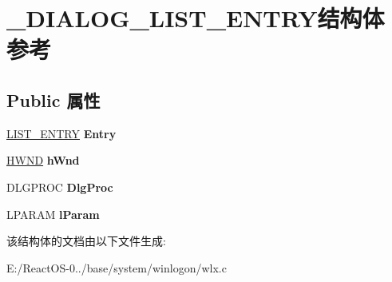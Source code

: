 \hypertarget{struct___d_i_a_l_o_g___l_i_s_t___e_n_t_r_y}{}\section{\+\_\+\+D\+I\+A\+L\+O\+G\+\_\+\+L\+I\+S\+T\+\_\+\+E\+N\+T\+R\+Y结构体 参考}
\label{struct___d_i_a_l_o_g___l_i_s_t___e_n_t_r_y}
\subsection*{Public 属性}
\begin{DoxyCompactItemize}
\item 
\mbox{\label{struct___d_i_a_l_o_g___l_i_s_t___e_n_t_r_y_a6d45c0cf84612d2be0380973ffe2b5a5}} 
\hyperlink{struct___l_i_s_t___e_n_t_r_y}{L\+I\+S\+T\+\_\+\+E\+N\+T\+RY} {\bfseries Entry}
\item 
\mbox{\label{struct___d_i_a_l_o_g___l_i_s_t___e_n_t_r_y_a59181e1c869c8fd26e33027d0d2f545b}} 
\hyperlink{interfacevoid}{H\+W\+ND} {\bfseries h\+Wnd}
\item 
\mbox{\label{struct___d_i_a_l_o_g___l_i_s_t___e_n_t_r_y_a7b360521da449f715ef6585fc511bbf9}} 
D\+L\+G\+P\+R\+OC {\bfseries Dlg\+Proc}
\item 
\mbox{\label{struct___d_i_a_l_o_g___l_i_s_t___e_n_t_r_y_aa6378bdb2ed58c9e4d5b9a6a56bcebe2}} 
L\+P\+A\+R\+AM {\bfseries l\+Param}
\end{DoxyCompactItemize}


该结构体的文档由以下文件生成\+:\begin{DoxyCompactItemize}
\item 
E\+:/\+React\+O\+S-\/0../base/system/winlogon/wlx.\+c\end{DoxyCompactItemize}
